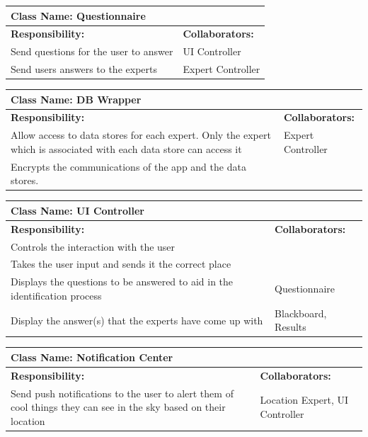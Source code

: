 \documentclass[]{article}
\begin{document}
	\begin{table}[h!]
		\centering
		\begin{tabular}{|p{5cm}|p{5cm}|}
		\hline 
		 \multicolumn{2}{|l|}{\textbf{Class Name:} Questionnaire} \\
		\hline
		\textbf{Responsibility:} & \textbf{Collaborators:} \\\hline
		Send questions for the user to answer & UI Controller\\
		\hline
		Send users answers to the experts & Expert Controller \\
		\hline
		\end{tabular}
	\end{table}
	
	\begin{table}[h!]
		\centering
		\begin{tabular}{|p{5cm}|p{5cm}|}
		\hline
		 \multicolumn{2}{|l|}{\textbf{Class Name:} DB Wrapper} \\
		\hline
		\textbf{Responsibility:} & \textbf{Collaborators:} \\\hline
		Allow access to data stores for each expert. Only the expert which is associated with each data store can access it & Expert Controller\\
		\hline
	    Encrypts the communications of the app and the data stores. & \\
		\hline
		\end{tabular}
	\end{table}
	
	\begin{table}[h!]
		\centering
		\begin{tabular}{|p{5cm}|p{5cm}|}
		\hline 
		 \multicolumn{2}{|l|}{\textbf{Class Name:} UI Controller} \\
		\hline
		\textbf{Responsibility:} & \textbf{Collaborators:} \\\hline
		Controls the interaction with the user & \\
		\hline
	    Takes the user input and sends it the correct place & \\
		\hline
		Displays the questions to be answered to aid in the identification process & Questionnaire \\
		\hline
		Display the answer(s) that the experts have come up with & Blackboard, Results \\
		\hline
		\end{tabular}
	\end{table}
	
	\begin{table}[h!]
		\centering
		\begin{tabular}{|p{5cm}|p{5cm}|}
		\hline 
		 \multicolumn{2}{|l|}{\textbf{Class Name:} Notification Center} \\
		\hline
		\textbf{Responsibility:} & \textbf{Collaborators:} \\\hline
		Send push notifications to the user to alert them of cool things they can see in the sky based on their location & Location Expert, UI Controller\\
		\hline
		\end{tabular}
	\end{table}
	
\end{document}
